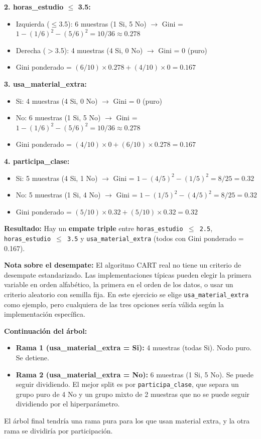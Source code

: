 \documentclass[12pt]{article}
\begin{document}
\textbf{2. horas\_estudio $\leq$ 3.5:}
\begin{itemize}
    \item Izquierda ($\leq$3.5): 6 muestras (1 Si, 5 No) $\rightarrow$ Gini = $1 - (1/6)^2 - (5/6)^2 = 10/36 \approx 0.278$
    \item Derecha ($>$3.5): 4 muestras (4 Si, 0 No) $\rightarrow$ Gini = 0 (puro)
    \item Gini ponderado = $(6/10) \times 0.278 + (4/10) \times 0 = 0.167$
\end{itemize}

\textbf{3. usa\_material\_extra:}
\begin{itemize}
    \item Si: 4 muestras (4 Si, 0 No) $\rightarrow$ Gini = 0 (puro)
    \item No: 6 muestras (1 Si, 5 No) $\rightarrow$ Gini = $1 - (1/6)^2 - (5/6)^2 = 10/36 \approx 0.278$
    \item Gini ponderado = $(4/10) \times 0 + (6/10) \times 0.278 = 0.167$
\end{itemize}

\textbf{4. participa\_clase:}
\begin{itemize}
    \item Si: 5 muestras (4 Si, 1 No) $\rightarrow$ Gini = $1 - (4/5)^2 - (1/5)^2 = 8/25 = 0.32$
    \item No: 5 muestras (1 Si, 4 No) $\rightarrow$ Gini = $1 - (1/5)^2 - (4/5)^2 = 8/25 = 0.32$
    \item Gini ponderado = $(5/10) \times 0.32 + (5/10) \times 0.32 = 0.32$
\end{itemize}

\textbf{Resultado:} Hay un \textbf{empate triple} entre \texttt{horas\_estudio $\leq$ 2.5}, \texttt{horas\_estudio $\leq$ 3.5} y \texttt{usa\_material\_extra} (todos con Gini ponderado = 0.167). 

\textbf{Nota sobre el desempate:} El algoritmo CART real no tiene un criterio de desempate estandarizado. Las implementaciones típicas pueden elegir la primera variable en orden alfabético, la primera en el orden de los datos, o usar un criterio aleatorio con semilla fija. En este ejercicio se elige \texttt{usa\_material\_extra} como ejemplo, pero cualquiera de las tres opciones sería válida según la implementación específica.

\textbf{Continuación del árbol:}
\begin{itemize}
    \item \textbf{Rama 1 (usa\_material\_extra = Si):} 4 muestras (todas Si). Nodo puro. Se detiene.
    \item \textbf{Rama 2 (usa\_material\_extra = No):} 6 muestras (1 Si, 5 No). Se puede seguir dividiendo. El mejor split es por \texttt{participa\_clase}, que separa un grupo puro de 4 No y un grupo mixto de 2 muestras que no se puede seguir dividiendo por el hiperparámetro.
\end{itemize}
El árbol final tendría una rama pura para los que usan material extra, y la otra rama se dividiría por participación.
\end{document}
